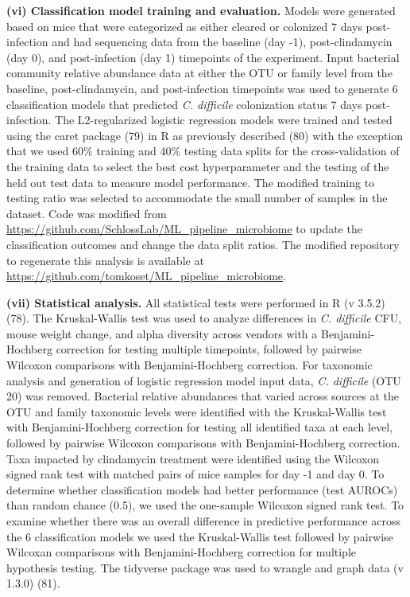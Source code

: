 \documentclass[11pt,]{article}
\begin{document}
\textbf{(vi) Classification model training and evaluation.} Models were
generated based on mice that were categorized as either cleared or
colonized 7 days post-infection and had sequencing data from the
baseline (day -1), post-clindamycin (day 0), and post-infection (day 1)
timepoints of the experiment. Input bacterial community relative
abundance data at either the OTU or family level from the baseline,
post-clindamycin, and post-infection timepoints was used to generate 6
classification models that predicted \emph{C. difficile} colonization
status 7 days post-infection. The L2-regularized logistic regression
models were trained and tested using the caret package (79) in R as
previously described (80) with the exception that we used 60\% training
and 40\% testing data splits for the cross-validation of the training
data to select the best cost hyperparameter and the testing of the held
out test data to measure model performance. The modified training to
testing ratio was selected to accommodate the small number of samples in
the dataset. Code was modified from
\url{https://github.com/SchlossLab/ML_pipeline_microbiome} to update the
classification outcomes and change the data split ratios. The modified
repository to regenerate this analysis is available at
\url{https://github.com/tomkoset/ML_pipeline_microbiome}.

\textbf{(vii) Statistical analysis.} All statistical tests were
performed in R (v 3.5.2) (78). The Kruskal-Wallis test was used to
analyze differences in \emph{C. difficile} CFU, mouse weight change, and
alpha diversity across vendors with a Benjamini-Hochberg correction for
testing multiple timepoints, followed by pairwise Wilcoxon comparisons
with Benjamini-Hochberg correction. For taxonomic analysis and
generation of logistic regression model input data, \emph{C. difficile}
(OTU 20) was removed. Bacterial relative abundances that varied across
sources at the OTU and family taxonomic levels were identified with the
Kruskal-Wallis test with Benjamini-Hochberg correction for testing all
identified taxa at each level, followed by pairwise Wilcoxon comparisons
with Benjamini-Hochberg correction. Taxa impacted by clindamycin
treatment were identified using the Wilcoxon signed rank test with
matched pairs of mice samples for day -1 and day 0. To determine whether
classification models had better performance (test AUROCs) than random
chance (0.5), we used the one-sample Wilcoxon signed rank test. To
examine whether there was an overall difference in predictive
performance across the 6 classification models we used the
Kruskal-Wallis test followed by pairwise Wilcoxan comparisons with
Benjamini-Hochberg correction for multiple hypothesis testing. The
tidyverse package was used to wrangle and graph data (v 1.3.0) (81).
\end{document}
